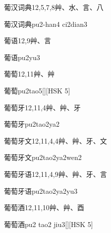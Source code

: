 \begin{Entry}{葡汉词典}{12,5,7,8}{⾋、⽔、⾔、⼋}
  \begin{Phonetics}{葡汉词典}{pu2-han4 ci2dian3}
  \end{Phonetics}
\end{Entry}

\begin{Entry}{葡语}{12,9}{⾋、⾔}
  \begin{Phonetics}{葡语}{pu2yu3}
  \end{Phonetics}
\end{Entry}

\begin{Entry}{葡萄}{12,11}{⾋、⾋}
  \begin{Phonetics}{葡萄}{pu2tao5}[][HSK 5]
  \end{Phonetics}
\end{Entry}

\begin{Entry}{葡萄牙}{12,11,4}{⾋、⾋、⽛}
  \begin{Phonetics}{葡萄牙}{pu2tao2ya2}
  \end{Phonetics}
\end{Entry}

\begin{Entry}{葡萄牙文}{12,11,4,4}{⾋、⾋、⽛、⽂}
  \begin{Phonetics}{葡萄牙文}{pu2tao2ya2wen2}
  \end{Phonetics}
\end{Entry}

\begin{Entry}{葡萄牙语}{12,11,4,9}{⾋、⾋、⽛、⾔}
  \begin{Phonetics}{葡萄牙语}{pu2tao2ya2yu3}
  \end{Phonetics}
\end{Entry}

\begin{Entry}{葡萄酒}{12,11,10}{⾋、⾋、⾣}
  \begin{Phonetics}{葡萄酒}{pu2 tao2 jiu3}[][HSK 5]
  \end{Phonetics}
\end{Entry}


